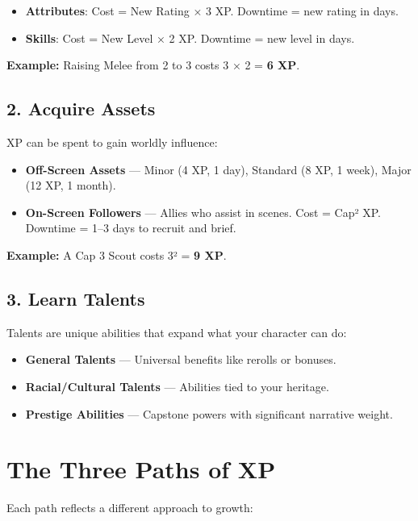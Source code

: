 \begin{itemize}
  \item \textbf{Attributes}: Cost = New Rating × 3 XP. Downtime = new rating in days.
  \item \textbf{Skills}: Cost = New Level × 2 XP. Downtime = new level in days.
\end{itemize}

\textbf{Example:} Raising Melee from 2 to 3 costs 3 × 2 = \textbf{6 XP}.

\subsection*{2. Acquire Assets}

XP can be spent to gain worldly influence:

\begin{itemize}
  \item \textbf{Off-Screen Assets} — Minor (4 XP, 1 day), Standard (8 XP, 1 week), Major (12 XP, 1 month).
  \item \textbf{On-Screen Followers} — Allies who assist in scenes. Cost = Cap² XP. Downtime = 1–3 days to recruit and brief.
\end{itemize}

\textbf{Example:} A Cap 3 Scout costs 3² = \textbf{9 XP}.

\subsection*{3. Learn Talents}

Talents are unique abilities that expand what your character can do:

\begin{itemize}
  \item \textbf{General Talents} — Universal benefits like rerolls or bonuses.
  \item \textbf{Racial/Cultural Talents} — Abilities tied to your heritage.
  \item \textbf{Prestige Abilities} — Capstone powers with significant narrative weight.
\end{itemize}

\section{The Three Paths of XP}

Each path reflects a different approach to growth:

